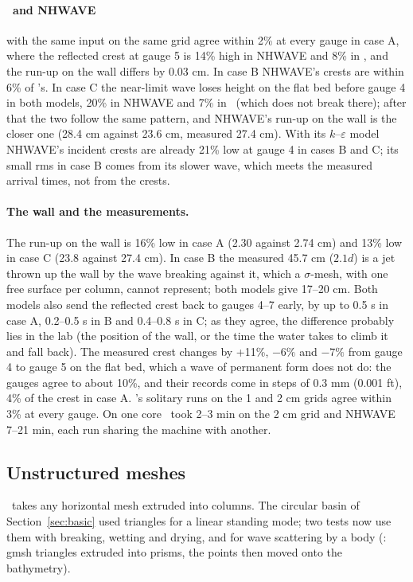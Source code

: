 \paragraph{\NHFOAM\ and NHWAVE} with the same input on the same grid agree
within 2\% at every gauge in case A, where the reflected crest at gauge 5 is
14\% high in NHWAVE and 8\% in \NHFOAM, and the run-up on the wall differs
by 0.03 cm. In case B NHWAVE's crests are within 6\% of \NHFOAM's. In case
C the near-limit wave loses height on the flat bed before gauge 4 in both
models, 20\% in NHWAVE and 7\% in \NHFOAM\ (which does not break there);
after that the two follow the same pattern, and NHWAVE's run-up on the wall
is the closer one (28.4 cm against 23.6 cm, measured 27.4 cm). With its
$k$--$\varepsilon$ model NHWAVE's incident crests are already 21\% low at
gauge 4 in cases B and C; its small rms in case B comes from its slower
wave, which meets the measured arrival times, not from the crests.

\paragraph{The wall and the measurements.} The run-up on the wall is 16\%
low in case A (2.30 against 2.74 cm) and 13\% low in case C (23.8 against
27.4 cm). In case B the measured 45.7 cm ($2.1d$) is a jet thrown up the
wall by the wave breaking against it, which a $\sigma$-mesh, with one free
surface per column, cannot represent; both models give 17--20 cm. Both
models also send the reflected crest back to gauges 4--7 early, by up to
0.5 s in case A, 0.2--0.5 s in B and 0.4--0.8 s in C; as they agree, the
difference probably lies in the lab (the position of the wall, or the time
the water takes to climb it and fall back). The measured crest changes by
+11\%, $-6\%$ and $-7\%$ from gauge 4 to gauge 5 on the flat bed, which a
wave of permanent form does not do: the gauges agree to about 10\%, and
their records come in steps of 0.3 mm (0.001 ft), 4\% of the crest in case
A. \NHFOAM's solitary runs on the 1 and 2 cm grids agree within 3\% at every
gauge. On one core \NHFOAM\ took 2--3 min on the 2 cm grid and NHWAVE
7--21 min, each run sharing the machine with another.

\subsection{Unstructured meshes}
\label{sec:unstr}

\NHFOAM\ takes any horizontal mesh extruded into columns. The circular basin
of Section~\ref{sec:basic} used triangles for a linear standing mode; two
tests now use them with breaking, wetting and drying, and for wave
scattering by a body (: gmsh triangles
extruded into prisms, the points then moved onto the bathymetry).


